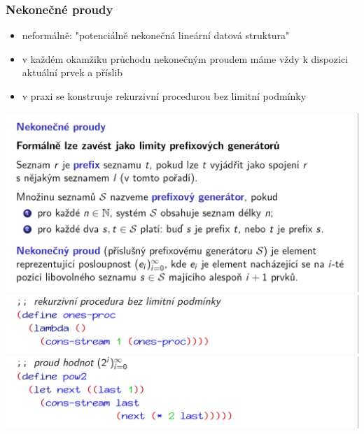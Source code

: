 \documentclass[10pt,a4paper]{article}
\begin{document}
\subsubsection{Nekonečné proudy}
\begin{itemize}
	\item neformálně: "potenciálně nekonečná lineární datová struktura"
	\item v každém okamžiku průchodu nekonečným proudem máme vždy k dispozici aktuální prvek a příslib
	\item v praxi se konstruuje rekurzivní procedurou bez limitní podmínky
\end{itemize}
\begin{center}
	\includegraphics[scale=0.35]{img/nekonecne_proudy_1}
	\includegraphics[scale=0.35]{img/nekonecne_proudy_2}
	\includegraphics[scale=0.35]{img/nekonecne_proudy_3}
\end{center}

\newpage
\end{document}
